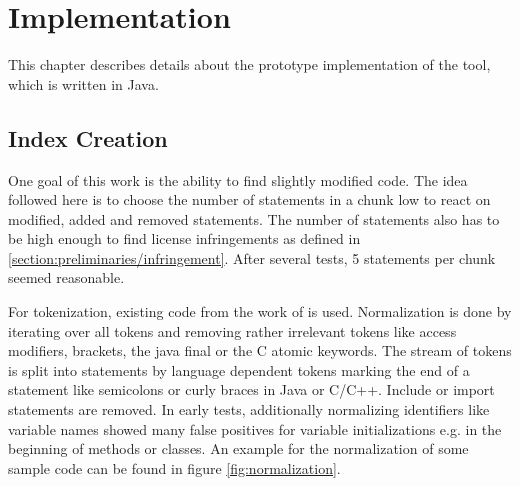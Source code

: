 

\chapter{Implementation}\label{chapter:implementation}
This chapter describes details about the prototype implementation of the tool, which is written in Java.

\section{Index Creation}\label{section:implementation/index_creation}
One goal of this work is the ability to find slightly modified code.
The idea followed here is to choose the number of statements in a chunk low to react on modified, added and removed statements.
The number of statements also has to be high enough to find license infringements as defined in \autoref{section:preliminaries/infringement}.
After several tests, 5 statements per chunk seemed reasonable.

For tokenization, existing code from the work of \cite{heinemann2014teamscale} is used.
Normalization is done by iterating over all tokens and removing rather irrelevant tokens like access modifiers, brackets, the java final or the C atomic keywords.
The stream of tokens is split into statements by language dependent tokens marking the end of a statement like semicolons or curly braces in Java or C/C++.
Include or import statements are removed.
In early tests, additionally normalizing identifiers like variable names showed many false positives for variable initializations e.g. in the beginning of methods or classes.
An example for the normalization of some sample code can be found in figure \ref{fig:normalization}.

